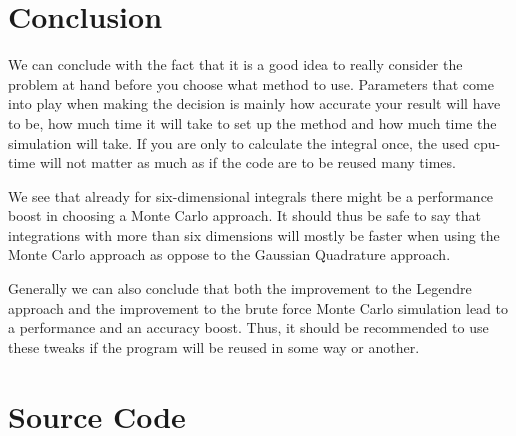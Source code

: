 \documentclass[11pt, a4paper]{article}
\begin{document}
\section{Conclusion}
We can conclude with the fact that it is a good idea to really consider the problem at hand before you choose what method to use. Parameters that come into play when making the decision is mainly how accurate your result will have to be, how much time it will take to set up the method and how much time the simulation will take. If you are only to calculate the integral once, the used cpu-time will not matter as much as if the code are to be reused many times. 

We see that already for six-dimensional integrals there might be a performance boost in choosing a Monte Carlo approach. It should thus be safe to say that integrations with more than six dimensions will mostly be faster when using the Monte Carlo approach as oppose to the Gaussian Quadrature approach. 

Generally we can also conclude that both the improvement to the Legendre approach and the improvement to the brute force Monte Carlo simulation lead to a performance and an accuracy boost. Thus, it should be recommended to use these tweaks if the program will be reused in some way or another.


\appendix
\section{Source Code}

\end{document}
